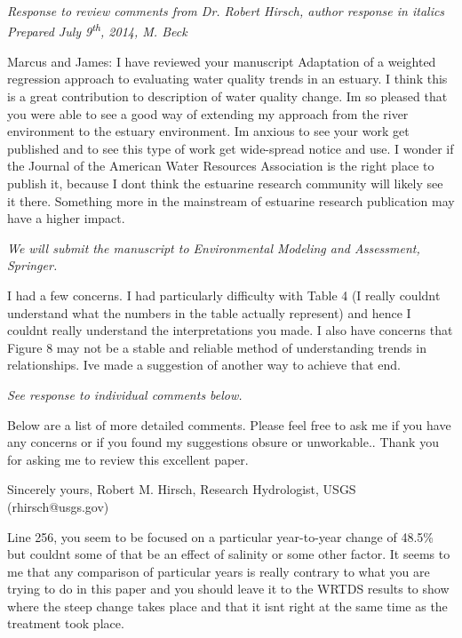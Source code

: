 \documentclass[letterpaper,12pt,oneside]{article}\usepackage[]{graphicx}\usepackage[]{color}
\begin{document}
\raggedbottom
\raggedright
{}
\setlength{\parindent}{0in}
\setlength{\parskip}{\baselineskip}

\textit{Response to review comments from Dr. Robert Hirsch, author response in italics\\
Prepared July 9\textsuperscript{th}, 2014, M. Beck}

Marcus and James: I have reviewed your manuscript Adaptation of a weighted regression approach to evaluating water quality trends in an estuary.  I think this is a great contribution to description of water quality change.  Im so pleased that you were able to see a good way of extending my approach from the river environment to the estuary environment.  Im anxious to see your work get published and to see this type of work get wide-spread notice and use.  I wonder if the Journal of the American Water Resources Association is the right place to publish it, because I dont think the estuarine research community will likely see it there.  Something more in the mainstream of estuarine research publication may have a higher impact.

\textit{We will submit the manuscript to Environmental Modeling and Assessment, Springer.}

I had a few concerns.  I had particularly difficulty with Table 4 (I really couldnt understand what the numbers in the table actually represent) and hence I couldnt really understand the interpretations you made.  I also have concerns that Figure 8 may not be a stable and reliable method of understanding trends in relationships.  Ive made a suggestion of another way to achieve that end.

\textit{See response to individual comments below.}

Below are a list of more detailed comments.  Please feel free to ask me if you have any concerns or if you found my suggestions obsure or unworkable..  Thank you for asking me to review this excellent paper.

Sincerely yours, Robert M. Hirsch, Research Hydrologist, USGS  (rhirsch@usgs.gov)

Line 256, you seem to be focused on a particular year-to-year change of 48.5\% but couldnt some of that be an effect of salinity or some other factor.  It seems to me that any comparison of particular years is really contrary to what you are trying to do in this paper and you should leave it to the WRTDS results to show where the steep change takes place and that it isnt right at the same time as the treatment took place.
\end{document}
